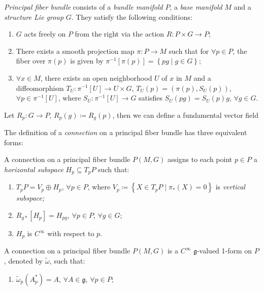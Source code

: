\begin{definition}
    \emph{Principal fiber bundle} consists of a \emph{bundle manifold} $P$, a \emph{base manifold} $M$ and a \emph{structure Lie group} $G$. They satisfy the following conditions:
    \begin{enumerate}
        \item $G$ acts freely on $P$ from the right via the action $R: P \times G \to P$;
        \item There exists a smooth projection map $\pi: P \to M$ such that for $\forall p \in P$, the fiber over $\pi(p)$ is given by $\pi^{-1}\left[\pi(p)\right] = \left\{ p g \mid g \in G \right\}$;
        \item $\forall x \in M$, there exists an open neighborhood $U$ of $x$ in $M$ and a diffeomorphism $T_U:\pi ^{-1}\left[ U \right] \rightarrow U\times G$, $T_U\left( p \right) =\left( \pi \left( p \right) ,S_U\left( p \right) \right)$, $\forall p\in \pi ^{-1}\left[ U \right]$, where $S_U:\pi ^{-1}\left[ U \right] \rightarrow G$ satisfies $S_U\left( pg \right) =S_U\left( p \right) g$, $\forall g\in G$.
    \end{enumerate}
\end{definition}


\begin{definition}
    Let $R_p:G\rightarrow P$, $R_p\left( g \right) \coloneq R_g\left( p \right)$, then we can define a fundamental vector field 
\end{definition}

The definition of a \emph{connection} on a principal fiber bundle has three equivalent forms:
\begin{definition}
    A connection on a principal fiber bundle $P\left(M,G\right)$ assigns to each point $p \in P$ a \emph{horizontal subspace} $H_p\subseteq T_pP$ such that:
    \begin{enumerate}
        \item $T_pP=V_p\oplus H_p$, $\forall p\in P$, where $V_p\coloneqq \left\{ X\in T_pP\mid \pi _*\left( X \right) =0 \right\}$ is \emph{vertical subspace;}
        \item $R_{g*}\left[ H_p \right] =H_{pg}$, $\forall p\in P$, $\forall g\in G$;
        \item $H_p$ is $C^\infty$ with respect to $p$.
    \end{enumerate}
\end{definition}
\begin{definition}
    A connection on a principal fiber bundle $P\left(M,G\right)$ is a $C^\infty$ $\mathfrak{g}$-valued 1-form on $P$, denoted by $\tilde{{\omega}}$, such that:
    \begin{enumerate}
        \item $\tilde{\omega}_p\left( A_{p}^{*} \right) =A$, $\forall A\in \mathfrak{g}$, $\forall p\in P$;
    \end{enumerate}
\end{definition}